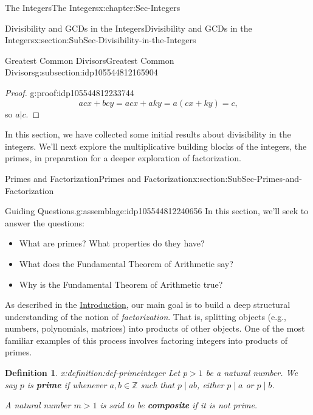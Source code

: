 \documentclass[oneside,10pt,]{book}
\newcommand{\terminology}[1]{\textbf{#1}}
\numberwithin{equation}{section}
\def\Z{{\mathbb Z}}
\newtheorem{definition}[theorem]{Definition}
\begin{document}
\begin{chapterptx}{The Integers}{}{The Integers}{}{}{x:chapter:Sec-Integers}
\begin{sectionptx}{Divisibility and GCDs in the Integers}{}{Divisibility and GCDs in the Integers}{}{}{x:section:SubSec-Divisibility-in-the-Integers}
\begin{subsectionptx}{Greatest Common Divisors}{}{Greatest Common Divisors}{}{}{g:subsection:idp105544812165904}
\begin{proof}{}{g:proof:idp105544812233744}
\begin{equation*}
acx + bcy = acx + aky = a(cx+ky) = c\text{,}
\end{equation*}
so \(a|c\).%
\end{proof}
\end{subsectionptx}
\begin{conclusion}{}%
In this section, we have collected some initial results about divisibility in the integers. We'll next explore the multiplicative building blocks of the integers, the primes, in preparation for a deeper exploration of factorization.%
\end{conclusion}%
\end{sectionptx}
%
%
\typeout{************************************************}
\typeout{************************************************}
%
\begin{sectionptx}{Primes and Factorization}{}{Primes and Factorization}{}{}{x:section:SubSec-Primes-and-Factorization}
\begin{assemblage}{Guiding Questions.}{g:assemblage:idp105544812240656}%
In this section, we'll seek to answer the questions: %
\begin{itemize}[label=\textbullet]
\item{}What are primes? What properties do they have?%
\item{}What does the Fundamental Theorem of Arithmetic say?%
\item{}Why is the Fundamental Theorem of Arithmetic true?%
\end{itemize}
%
\end{assemblage}
As described in the \hyperref[x:preface:Sec-Introduction]{Introduction}, our main goal is to build a deep structural understanding of the notion of \emph{factorization}. That is, splitting objects (e.g., numbers, polynomials, matrices) into products of other objects. One of the most familiar examples of this process involves factoring integers into products of primes.%
\begin{definition}{}{x:definition:def-primeinteger}%
%
%
Let \(p > 1\) be a natural number. We say \(p\) is \terminology{prime} if whenever \(a,b\in \Z\) such that \(p\mid ab\), either \(p\mid a\) or \(p\mid b\).%
\par
A natural number \(m > 1\) is said to be \terminology{composite} if it is not prime.%
\end{definition}

\end{sectionptx}
\end{chapterptx}
\end{document}
